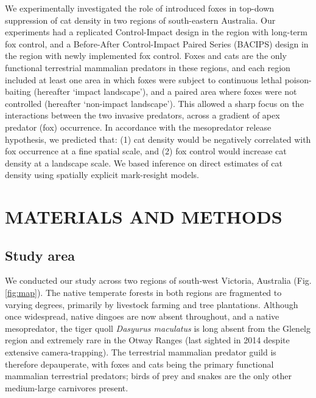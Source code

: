 \documentclass[]{elsarticle} %
\begin{document}
We experimentally investigated the role of introduced foxes in top-down suppression of cat density in two regions of south-eastern Australia. Our experiments had a replicated Control-Impact design in the region with long-term fox control, and a Before-After Control-Impact Paired Series (BACIPS) design in the region with newly implemented fox control. Foxes and cats are the only functional terrestrial mammalian predators in these regions, and each region included at least one area in which foxes were subject to continuous lethal poison-baiting (hereafter `impact landscape'), and a paired area where foxes were not controlled (hereafter `non-impact landscape'). This allowed a sharp focus on the interactions between the two invasive predators, across a gradient of apex predator (fox) occurrence. In accordance with the mesopredator release hypothesis, we predicted that: (1) cat density would be negatively correlated with fox occurrence at a fine spatial scale, and (2) fox control would increase cat density at a landscape scale. We based inference on direct estimates of cat density using spatially explicit mark-resight models.

\newpage

\hypertarget{materials-and-methods}{%
\section{MATERIALS AND METHODS}\label{materials-and-methods}}

\hypertarget{study-area}{%
\subsection{Study area}\label{study-area}}

We conducted our study across two regions of south-west Victoria, Australia (Fig. \ref{fig:map}). The native temperate forests in both regions are fragmented to varying degrees, primarily by livestock farming and tree plantations. Although once widespread, native dingoes are now absent throughout, and a native mesopredator, the tiger quoll \emph{Dasyurus maculatus} is long absent from the Glenelg region and extremely rare in the Otway Ranges (last sighted in 2014 despite extensive camera-trapping). The terrestrial mammalian predator guild is therefore depauperate, with foxes and cats being the primary functional mammalian terrestrial predators; birds of prey and snakes are the only other medium-large carnivores present.
\end{document}
